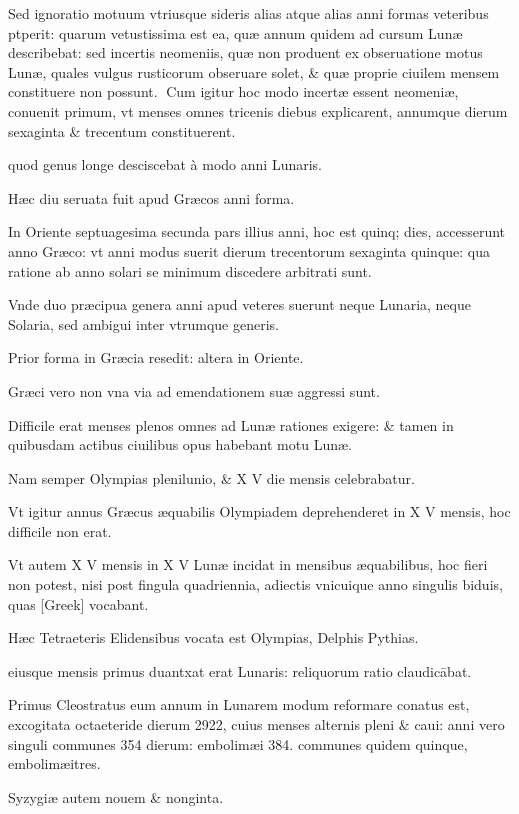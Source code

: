 \begin{parnumbers}

Sed ignoratio motuum vtriusque sideris alias atque alias anni formas veteribus  ptperit: quarum vetustissima est ea, quæ annum quidem ad cursum Lunæ describebat: sed incertis neomeniis, quæ non produent ex obseruatione motus Lunæ, quales vulgus rusticorum obseruare solet, \& quæ proprie ciuilem mensem constituere non possunt.
Cum igitur hoc modo incertæ essent neomeniæ, conuenit primum, vt menses omnes tricenis diebus explicarent, annumque dierum sexaginta \& trecentum constituerent.

quod genus longe desciscebat à modo anni Lunaris.

Hæc diu seruata fuit apud Græcos anni forma.

In Oriente septuagesima secunda pars illius anni, hoc est quinq; dies, accesserunt anno Græco: vt anni modus suerit dierum trecentorum sexaginta quinque:  qua ratione ab anno solari se minimum discedere arbitrati sunt.

Vnde duo præcipua genera anni apud veteres suerunt neque Lunaria, neque Solaria, sed ambigui inter vtrumque generis.

Prior forma in Græcia resedit: altera in Oriente.

Græci vero non vna via ad emendationem suæ aggressi sunt.

Difficile erat menses plenos omnes ad Lunæ rationes exigere: \& tamen in quibusdam actibus ciuilibus opus habebant motu Lunæ.

Nam semper Olympias plenilunio, \& X V die mensis celebrabatur.

Vt igitur annus Græcus æquabilis Olympiadem deprehenderet in X V mensis, hoc difficile non erat.

Vt autem X V mensis in X V Lunæ incidat in mensibus æquabilibus, hoc fieri non potest, nisi post fingula quadriennia, adiectis vnicuique anno singulis  biduis, quas \textgreek{[Greek]} vocabant.

Hæc Tetraeteris Elidensibus vocata est Olympias, Delphis Pythias.

eiusque mensis primus duantxat erat Lunaris: reliquorum ratio claudicābat.

Primus Cleostratus eum annum in Lunarem modum reformare conatus est, excogitata octaeteride dierum 2922, cuius menses alternis pleni \& caui: anni vero singuli communes 354 dierum: embolimæi 384. communes quidem quinque, embolimæitres.

Syzygiæ autem nouem \& nonginta.


\end{parnumbers}

